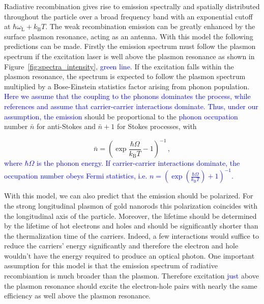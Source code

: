 \documentclass[journal=nalefd,manuscript=letter]{achemso}
\newcommand{\HI}[1]{\textcolor{blue}{#1}} %
\begin{document}
Radiative recombination gives rise to emission spectrally and
spatially distributed throughout the particle over a broad frequency band with
an exponential cutoff at $\hbar\omega_\textrm{L}+k_\textrm{B}T$. The weak
recombination emission can be greatly enhanced by the surface plasmon resonance,
acting as an antenna. 
With this model the following predictions can be made.
Firstly the emission spectrum must follow the plasmon spectrum if the excitation
laser is well above the plasmon resonance as shown in \mbox{Figure
\ref{fig:spectra_intensity}}, \HI{green line}. If the excitation falls within the
plasmon resonance, the spectrum is expected to follow the plasmon spectrum
multiplied by a Bose-Einstein statistics factor arising from phonon population. 
\HI{Here we assume that the coupling to the phonons dominates the process, while references
\cite{Huang2014} and \cite{mertens2017light} assume that carrier-carrier interactions dominate.
Thus, under our assumption, the emission} should be proportional to the \HI{phonon occupation} number $\bar{n}$ 
for anti-Stokes and $\bar{n}+1$ for Stokes processes, with

\begin{equation}\label{eqn:BE}
	\bar{n}=\left(\exp\frac{\hbar\Omega}{k_\textrm{B}T}-1\right)^{-1}\,,
\end{equation}
\HI{where $\hbar\Omega$ is the phonon energy. If 
carrier-carrier interactions dominate, the occupation number 
obeys Fermi statistics, i.e. $n=\left(\exp(\frac{\hbar \Omega}{k_\textrm{B}T})+1 \right)^{-1}$\cite{Huang2014,mertens2017light}.} 

With this model, we can also predict that the emission should be polarized. 
For the strong longitudinal plasmon of gold nanorods this polarization coincides with
the longitudinal axis of the particle\cite{He2015}. Moreover, the lifetime
should be determined by the lifetime of hot electrons and holes and should be
significantly shorter than the thermalization time of the carriers. 
Indeed, a few interactions would suffice to reduce the carriers' energy significantly
and therefore the electron and hole wouldn't have the energy required to produce an
optical photon. 
One important assumption for this model is that the emission spectrum
of radiative recombiantion is much broader than the plasmon. 
Therefore excitation \HI{just} above the plasmon resonance should excite the 
electron-hole pairs with nearly the same efficiency as well above the plasmon
resonance\cite{Cheng2015,mertens2017light}. 
\end{document}
